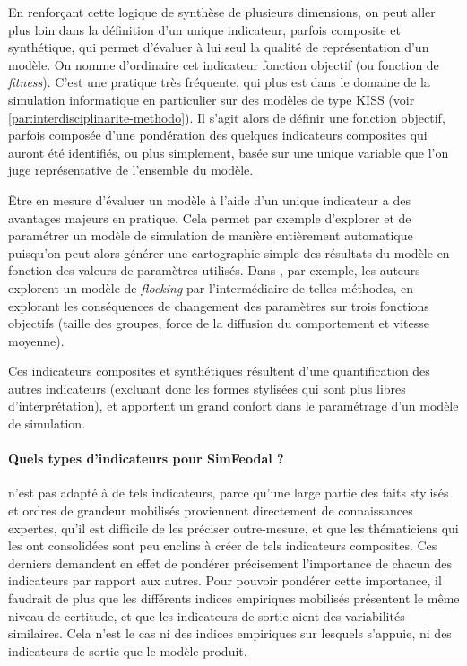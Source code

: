 En renforçant cette logique de synthèse de plusieurs dimensions, on peut aller plus loin dans la définition d'un unique indicateur, parfois composite et synthétique, qui permet d'évaluer à lui seul la qualité de représentation d'un modèle.
On nomme d'ordinaire cet indicateur \og fonction objectif\fg{} (ou \og fonction de \textit{fitness}\fg{}).
C'est une pratique très fréquente, qui plus est dans le domaine de la simulation informatique en particulier sur des modèles de type \og KISS\fg{} (voir \cref{par:interdisciplinarite-methodo}).
Il s'agit alors de définir une \og fonction objectif\fg{}, parfois composée d'une pondération des quelques indicateurs composites qui auront été identifiés, ou plus simplement, basée sur une unique variable que l'on juge représentative de l'ensemble du modèle.

Être en mesure d'évaluer un modèle à l'aide d'un unique indicateur a des avantages majeurs en pratique.
Cela permet par exemple d'explorer et de paramétrer un modèle de simulation de manière entièrement automatique puisqu'on peut alors générer une cartographie simple des résultats du modèle en fonction des valeurs de paramètres utilisés.
Dans \textcite{cherel_beyond_2015}, par exemple, les auteurs explorent un modèle de \og \textit{flocking}\fg{} par l'intermédiaire de telles méthodes, en explorant les conséquences de changement des paramètres sur trois fonctions objectifs (taille des groupes, force de la diffusion du comportement et vitesse moyenne).

Ces indicateurs composites et synthétiques résultent d'une quantification des autres indicateurs (excluant donc les formes stylisées qui sont plus libres d'interprétation), et apportent un grand confort dans le paramétrage d'un modèle de simulation.

\paragraph{Quels types d'indicateurs pour SimFeodal ?}\label{par:indicateurs-simfeodal}

\simfeodal{} n'est pas adapté à de tels indicateurs, parce qu'une large partie des faits stylisés et ordres de grandeur mobilisés proviennent directement de connaissances expertes, qu'il est difficile de les préciser outre-mesure, et que les thématiciens qui les ont consolidées sont peu enclins à créer de tels indicateurs composites.
Ces derniers demandent en effet de pondérer précisement l'importance de chacun des indicateurs par rapport aux autres.
Pour pouvoir pondérer cette importance, il faudrait de plus que les différents indices empiriques mobilisés présentent le même niveau de certitude, et que les indicateurs de sortie aient des variabilités similaires.
Cela n'est le cas ni des indices empiriques sur lesquels \simfeodal{} s'appuie, ni des indicateurs de sortie que le modèle produit.

